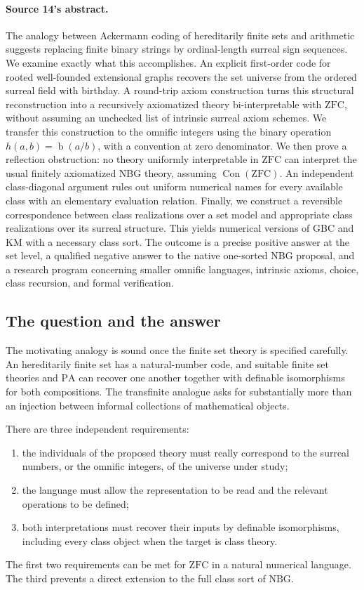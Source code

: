 \documentclass[11pt,letterpaper]{article}
\theoremstyle{definition}
\theoremstyle{remark}
\newcommand{\bd}{\operatorname{b}}
\newcommand{\ZFC}{\mathrm{ZFC}}
\newcommand{\NBG}{\mathrm{NBG}}
\newcommand{\PA}{\mathrm{PA}}
\newcommand{\Con}{\operatorname{Con}}
\begin{document}
\paragraph{Source 14's abstract.} The analogy between Ackermann coding of
hereditarily finite sets and arithmetic suggests replacing finite binary strings
by ordinal-length surreal sign sequences. We examine exactly what this
accomplishes. An explicit first-order code for rooted well-founded extensional
graphs recovers the set universe from the ordered surreal field with birthday. A
round-trip axiom construction turns this structural reconstruction into a
recursively axiomatized theory bi-interpretable with $\ZFC$, without assuming an
unchecked list of intrinsic surreal axiom schemes. We transfer this construction
to the omnific integers using the binary operation $h(a,b)=\bd(a/b)$, with a
convention at zero denominator. We then prove a reflection obstruction: no
theory uniformly interpretable in $\ZFC$ can interpret the usual finitely
axiomatized NBG theory, assuming $\Con(\ZFC)$. An independent class-diagonal
argument rules out uniform numerical names for every available class with an
elementary evaluation relation. Finally, we construct a reversible
correspondence between class realizations over a set model and appropriate class
realizations over its surreal structure. This yields numerical versions of GBC
and KM with a necessary class sort. The outcome is a precise positive answer at
the set level, a qualified negative answer to the native one-sorted NBG proposal,
and a research program concerning smaller omnific languages, intrinsic axioms,
choice, class recursion, and formal verification.

\subsection{The question and the answer}
\label{hset:sf:sub:question}

The motivating analogy is sound once the finite set theory is specified
carefully. An hereditarily finite set has a natural-number code, and suitable
finite set theories and $\PA$ can recover one another together with definable
isomorphisms for both compositions. The transfinite analogue asks for
substantially more than an injection between informal collections of
mathematical objects.

There are three independent requirements:
\begin{enumerate}
\item the individuals of the proposed theory must really correspond to the
surreal numbers, or the omnific integers, of the universe under study;
\item the language must allow the representation to be read and the relevant
operations to be defined;
\item both interpretations must recover their inputs by definable isomorphisms,
including every class object when the target is class theory.
\end{enumerate}
The first two requirements can be met for $\ZFC$ in a natural numerical
language. The third prevents a direct extension to the full class sort of
$\NBG$.
\end{document}
